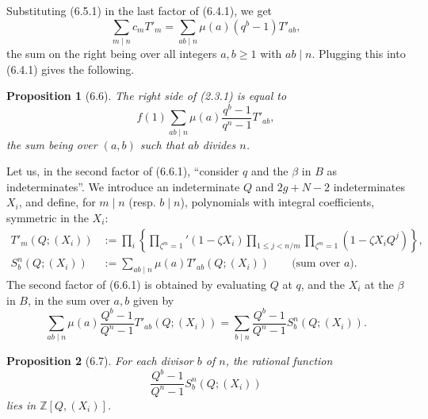 \documentclass[10pt]{article}
\newcommand{\Z}{\mathbb Z}
\theoremstyle{deligne}
\newtheorem*{proposition*}{Proposition}
\begin{document}
Substituting (6.5.1) in the last factor of (6.4.1), we get
\begin{equation}\tag{6.5.2}
\sum_{m\mid n}c_mT'_m=\sum_{ab\mid n}\mu(a)(q^b-1)T'_{ab},
\end{equation}
the sum on the right being over all integers $a,b\ge1$ with $ab\mid n$. Plugging this into (6.4.1) gives the following.

\begin{proposition*}[6.6]
The right side of (2.3.1) is equal to
\begin{equation}\tag{6.6.1}
f(1)\sum_{ab\mid n}\mu(a)\frac{q^b-1}{q^n-1}T'_{ab},
\end{equation}
the sum being over $(a,b)$ such that $ab$ divides $n$.
\end{proposition*}

Let us, in the second factor of (6.6.1), ``consider $q$ and the $\beta$ in $B$ as indeterminates''. We introduce an indeterminate $Q$ and $2g+N-2$ indeterminates $X_i$, and define, for $m\mid n$ (resp. $b\mid n$), polynomials with integral coefficients, symmetric in the $X_i$:
\begin{align}
T'_m(Q;(X_i))&:=\prod_i\left\{\prod_{\zeta^m=1}'(1-\zeta X_i)\prod_{1\le j<n/m}\prod_{\zeta^m=1}(1-\zeta X_iQ^j)\right\},\tag{6.6.2}\\
S_b^n(Q;(X_i))&:=\sum_{ab\mid n}\mu(a)T'_{ab}(Q;(X_i))\qquad\text{(sum over $a$).}\tag{6.6.3}
\end{align}
The second factor of (6.6.1) is obtained by evaluating $Q$ at $q$, and the $X_i$ at the $\beta$ in $B$, in the sum over $a,b$ given by
\begin{equation}\tag{6.6.4}
\sum_{ab\mid n}\mu(a)\frac{Q^b-1}{Q^n-1}T'_{ab}(Q;(X_i))
=\sum_{b\mid n}\frac{Q^b-1}{Q^n-1}S_b^n(Q;(X_i)).
\end{equation}

\begin{proposition*}[6.7]
For each divisor $b$ of $n$, the rational function
\[
\frac{Q^b-1}{Q^n-1}S_b^n(Q;(X_i))
\]
lies in $\Z[Q,(X_i)]$.
\end{proposition*}
\end{document}
